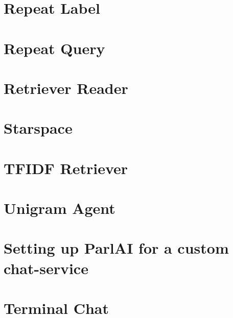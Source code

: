 \documentclass[twoside]{book}
\newcommand{\+}{\discretionary{\mbox{\scriptsize$\hookleftarrow$}}{}{}}
\begin{document}
\chapter{Repeat Label}
\label{md_parlai_agents_repeat_label_README}

\chapter{Repeat Query}
\label{md_parlai_agents_repeat_query_README}

\chapter{Retriever Reader}
\label{md_parlai_agents_retriever_reader_README}

\chapter{Starspace}
\label{md_parlai_agents_starspace_README}

\chapter{T\+F\+I\+DF Retriever}
\label{md_parlai_agents_tfidf_retriever_README}

\chapter{Unigram Agent}
\label{md_parlai_agents_unigram_README}

\chapter{Setting up Parl\+AI for a custom chat-\/service}
\label{md_parlai_chat_service_README}

\chapter{Terminal Chat}
\label{md_parlai_chat_service_services_terminal_chat_README}

\end{document}
